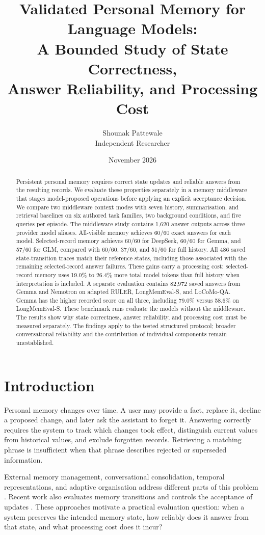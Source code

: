 \documentclass[11pt,a4paper]{article}
\title{Validated Personal Memory for Language Models:\\A Bounded Study of State Correctness,\\Answer Reliability, and Processing Cost}
\author{Shounak Pattewale\\\small Independent Researcher}
\date{November 2026}
\begin{document}
\maketitle
\begin{abstract}
Persistent personal memory requires correct state updates and reliable answers from the resulting records. We evaluate these properties separately in a memory middleware that stages model-proposed operations before applying an explicit acceptance decision. We compare two middleware context modes with seven history, summarisation, and retrieval baselines on six authored task families, two background conditions, and five queries per episode. The middleware study contains 1,620 answer outputs across three provider model aliases. All-visible memory achieves 60/60 exact answers for each model. Selected-record memory achieves 60/60 for DeepSeek, 60/60 for Gemma, and 57/60 for GLM, compared with 60/60, 37/60, and 51/60 for full history. All 486 saved state-transition traces match their reference states, including those associated with the remaining selected-record answer failures. These gains carry a processing cost: selected-record memory uses 19.0\% to 26.4\% more total model tokens than full history when interpretation is included. A separate evaluation contains 82,972 saved answers from Gemma and Nemotron on adapted RULER, LongMemEval-S, and LoCoMo-QA. Gemma has the higher recorded score on all three, including 79.0\% versus 58.6\% on LongMemEval-S. These benchmark runs evaluate the models without the middleware. The results show why state correctness, answer reliability, and processing cost must be measured separately. The findings apply to the tested structured protocol; broader conversational reliability and the contribution of individual components remain unestablished.
\end{abstract}

\section{Introduction}
Personal memory changes over time. A user may provide a fact, replace it, decline a proposed change, and later ask the assistant to forget it. Answering correctly requires the system to track which changes took effect, distinguish current values from historical values, and exclude forgotten records. Retrieving a matching phrase is insufficient when that phrase describes rejected or superseded information.

External memory management, conversational consolidation, temporal representations, and adaptive organisation address different parts of this problem \cite{memgpt,mem0,zep,amem}. Recent work also evaluates memory transitions and controls the acceptance of updates \cite{trustmem,janus,halumem}. These approaches motivate a practical evaluation question: when a system preserves the intended memory state, how reliably does it answer from that state, and what processing cost does it incur?
\end{document}
